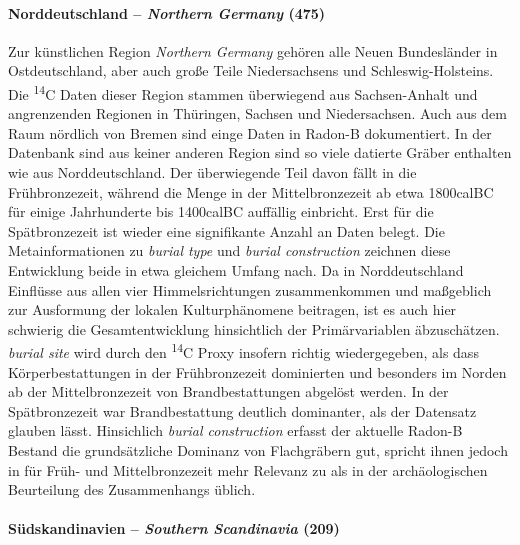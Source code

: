 \documentclass[openany,twoside,twocolumn]{book}
\begin{document}
\hypertarget{norddeutschland-northern-germany-475}{%
\paragraph{\texorpdfstring{Norddeutschland -- \emph{Northern Germany}
(475)}{Norddeutschland -- Northern Germany (475)}}\label{norddeutschland-northern-germany-475}}

Zur künstlichen Region \emph{Northern Germany} gehören alle Neuen
Bundesländer in Ostdeutschland, aber auch große Teile Niedersachsens und
Schleswig-Holsteins. Die \textsuperscript{14}C Daten dieser Region
stammen überwiegend aus Sachsen-Anhalt und angrenzenden Regionen in
Thüringen, Sachsen und Niedersachsen. Auch aus dem Raum nördlich von
Bremen sind einge Daten in Radon-B dokumentiert. In der Datenbank sind
aus keiner anderen Region sind so viele datierte Gräber enthalten wie
aus Norddeutschland. Der überwiegende Teil davon fällt in die
Frühbronzezeit, während die Menge in der Mittelbronzezeit ab etwa
1800calBC für einige Jahrhunderte bis 1400calBC auffällig einbricht.
Erst für die Spätbronzezeit ist wieder eine signifikante Anzahl an Daten
belegt. Die Metainformationen zu \emph{burial type} und \emph{burial
construction} zeichnen diese Entwicklung beide in etwa gleichem Umfang
nach. Da in Norddeutschland Einflüsse aus allen vier Himmelsrichtungen
zusammenkommen und maßgeblich zur Ausformung der lokalen Kulturphänomene
beitragen, ist es auch hier schwierig die Gesamtentwicklung hinsichtlich
der Primärvariablen äbzuschätzen. \emph{burial site} wird durch den
\textsuperscript{14}C Proxy insofern richtig wiedergegeben, als dass
Körperbestattungen in der Frühbronzezeit dominierten und besonders im
Norden ab der Mittelbronzezeit von Brandbestattungen abgelöst werden. In
der Spätbronzezeit war Brandbestattung deutlich dominanter, als der
Datensatz glauben lässt. Hinsichlich \emph{burial construction} erfasst
der aktuelle Radon-B Bestand die grundsätzliche Dominanz von
Flachgräbern gut, spricht ihnen jedoch in für Früh- und Mittelbronzezeit
mehr Relevanz zu als in der archäologischen Beurteilung des
Zusammenhangs üblich.

\hypertarget{sudskandinavien-southern-scandinavia-209}{%
\paragraph{\texorpdfstring{Südskandinavien -- \emph{Southern
Scandinavia}
(209)}{Südskandinavien -- Southern Scandinavia (209)}}\label{sudskandinavien-southern-scandinavia-209}}
\end{document}
